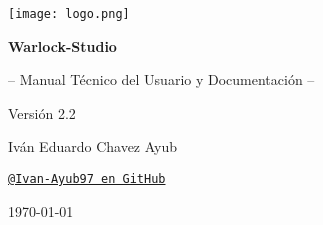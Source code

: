 \documentclass[11pt, a4paper]{article}
\begin{document}
\begin{titlepage}
    \begin{tcolorbox}[
        colback=WarlockDark,                    %
        colframe=WarlockGold,                   %
        sharp corners,                          %
        boxrule=1.5pt,                          %
        halign=center,                          %
        valign=center,                          %
        height=\dimexpr\textheight-1cm\relax    %
      ]
      \centering %

      \texttt{[image: logo.png]}\par %

      \vfill %

      \color{white} %

      {\Huge\bfseries Warlock-Studio\par}
      \vspace{0.7cm} %
      {\Large -- Manual Técnico del Usuario y Documentación --\par}
      \vspace{0.2cm}
      {\Large Versión 2.2\par}

      \vfill %

      {\large Iván Eduardo Chavez Ayub\par}
      \href{https://github.com/Ivan-Ayub97}{\texttt{\color{WarlockGold}@Ivan-Ayub97 en GitHub}}\par %

      \vspace{1.5cm}

      {\large \today\par} %
    \end{tcolorbox}
    \thispagestyle{empty} %
\end{titlepage}
\end{document}
